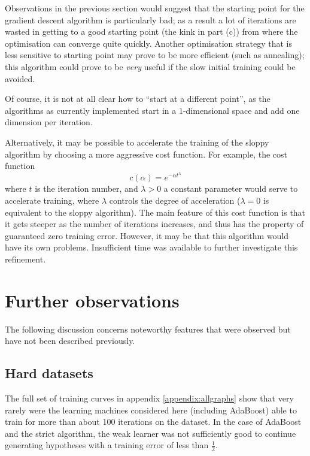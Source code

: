 Observations in the previous section would suggest that the starting
point for the gradient descent algorithm is particularly bad; as a
result a lot of iterations are wasted in getting to a good starting
point (the kink in part (c)) from where the optimisation can converge
quite quickly. Another optimisation strategy that is less sensitive to
starting point may prove to be more efficient (such as annealing);
this algorithm could prove to be \emph{very} useful if the slow
initial training could be avoided.

Of course, it is not at all clear how to ``start at a different
point'', as the algorithms as currently implemented start in a
$1$-dimensional space and add one dimension per iteration.

Alternatively, it may be possible to accelerate the training of the
sloppy algorithm by choosing a more aggressive cost function.  For
example, the cost function
%
\begin{equation}
c(\alpha) = e^{-\alpha t^\lambda}
\end{equation}
%
where $t$ is the iteration number, and $\lambda>0$ a constant
parameter would serve to accelerate training, where $\lambda$ controls
the degree of acceleration ($\lambda=0$ is equivalent to the sloppy 
algorithm).  The main feature of this cost function is that it gets
steeper as the number of iterations increases, and thus has the
property of guaranteed zero training error.  However, it may be that
this algorithm would have its own problems.  Insufficient time was
available to further investigate this refinement.

\section{Further observations}

The following discussion concerns noteworthy features that were
observed but have not been described previously.

\subsection{Hard datasets}

The full set of training curves in appendix \ref{appendix:allgraphs}
show that very rarely were the learning machines considered here
(including AdaBoost) able to train for more than about 100 iterations
on the  dataset.  In the case of AdaBoost and the strict
algorithm, the weak learner was not sufficiently good to continue
generating hypotheses with a training error of less than
$\frac{1}{2}$.

